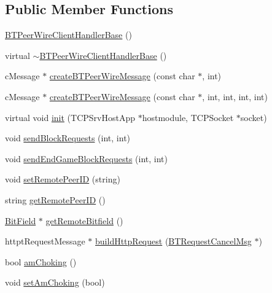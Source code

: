 \subsection*{Public Member Functions}
\begin{DoxyCompactItemize}
\item 
\hyperlink{classBTPeerWireClientHandlerBase_ac7325e2bd56ed10022900f02163b0c1f}{B\+T\+Peer\+Wire\+Client\+Handler\+Base} ()
\item 
virtual \hyperlink{classBTPeerWireClientHandlerBase_a5f7019d47fdcf107d6ec2bfaeeb503fc}{$\sim$\+B\+T\+Peer\+Wire\+Client\+Handler\+Base} ()
\item 
c\+Message $\ast$ \hyperlink{classBTPeerWireClientHandlerBase_a9d8b08a5439211d0bb8329a162873507}{create\+B\+T\+Peer\+Wire\+Message} (const char $\ast$, int)
\item 
c\+Message $\ast$ \hyperlink{classBTPeerWireClientHandlerBase_afd0a266c3f5974f73bece07d10958433}{create\+B\+T\+Peer\+Wire\+Message} (const char $\ast$, int, int, int, int)
\item 
virtual void \hyperlink{classBTPeerWireClientHandlerBase_a45da9fc8b5c7775ccd8c655f01daa94d}{init} (T\+C\+P\+Srv\+Host\+App $\ast$hostmodule, T\+C\+P\+Socket $\ast$socket)
\item 
void \hyperlink{classBTPeerWireClientHandlerBase_a6be659855aedc7329581b0126a3a2f91}{send\+Block\+Requests} (int, int)
\item 
void \hyperlink{classBTPeerWireClientHandlerBase_a6cd1b6f7c992e161427270ea22d7e0bb}{send\+End\+Game\+Block\+Requests} (int, int)
\item 
void \hyperlink{classBTPeerWireClientHandlerBase_a23f4981ac7567bd8de2e3abfe09e0e59}{set\+Remote\+Peer\+I\+D} (string)
\item 
string \hyperlink{classBTPeerWireClientHandlerBase_ae628b93afb6883201da0457b43f7d02a}{get\+Remote\+Peer\+I\+D} ()
\item 
\hyperlink{classBitField}{Bit\+Field} $\ast$ \hyperlink{classBTPeerWireClientHandlerBase_a4345688ea84e947d57f9da6e32633628}{get\+Remote\+Bitfield} ()
\item 
httpt\+Request\+Message $\ast$ \hyperlink{classBTPeerWireClientHandlerBase_a8adacdf80a2b2e27e43e4646656a81e3}{build\+Http\+Request} (\hyperlink{classBTRequestCancelMsg}{B\+T\+Request\+Cancel\+Msg} $\ast$)
\item 
bool \hyperlink{classBTPeerWireClientHandlerBase_a93eef1a2a5e75b5e38e4d26c5b3fc4c2}{am\+Choking} ()
\item 
void \hyperlink{classBTPeerWireClientHandlerBase_a1e570420131edef266b7321f61aed75a}{set\+Am\+Choking} (bool)

\end{DoxyCompactItemize}
